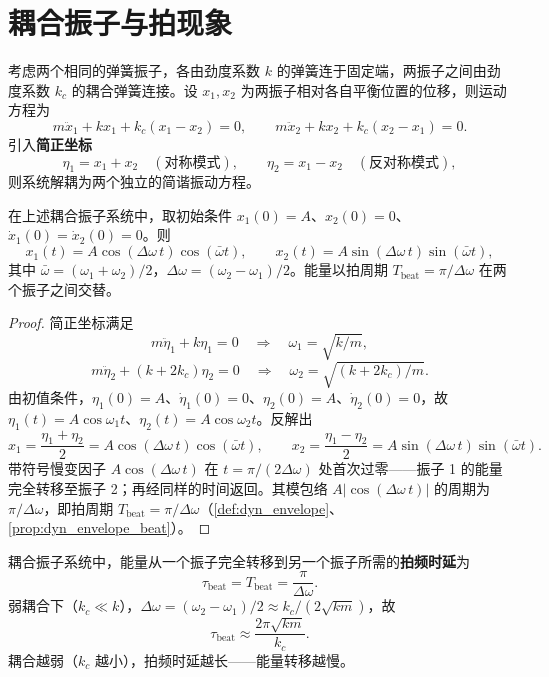 \section{耦合振子与拍现象}

\begin{definition}[耦合弹簧振子系统]\label{def:coupled_oscillators}
考虑两个相同的弹簧振子，各由劲度系数 $k$ 的弹簧连于固定端，两振子之间由劲度系数 $k_c$ 的耦合弹簧连接。设 $x_1, x_2$ 为两振子相对各自平衡位置的位移，则运动方程为
\[
m\ddot{x}_1 + kx_1 + k_c(x_1 - x_2) = 0, \qquad m\ddot{x}_2 + kx_2 + k_c(x_2 - x_1) = 0.
\]
引入\textbf{简正坐标}
\[
\eta_1 = x_1 + x_2 \quad (\text{对称模式}), \qquad \eta_2 = x_1 - x_2 \quad (\text{反对称模式}),
\]
则系统解耦为两个独立的简谐振动方程。
\end{definition}

\begin{proposition}\label{prop:beat_phenomenon}
在上述耦合振子系统中，取初始条件 $x_1(0) = A$、$x_2(0) = 0$、$\dot x_1(0) = \dot x_2(0) = 0$。则
\[
x_1(t) = A\cos(\Delta\omega \, t)\cos(\bar{\omega} t), \qquad x_2(t) = A\sin(\Delta\omega \, t)\sin(\bar{\omega} t),
\]
其中 $\bar\omega = (\omega_1 + \omega_2)/2$，$\Delta\omega = (\omega_2 - \omega_1)/2$。能量以拍周期 $T_{\text{beat}} = \pi/\Delta\omega$ 在两个振子之间交替。
\end{proposition}

\begin{proof}
简正坐标满足
\[
m\ddot\eta_1 + k\eta_1 = 0 \quad \Rightarrow \quad \omega_1 = \sqrt{k/m},
\]
\[
m\ddot\eta_2 + (k + 2k_c)\eta_2 = 0 \quad \Rightarrow \quad \omega_2 = \sqrt{(k+2k_c)/m}.
\]
由初值条件，$\eta_1(0) = A$、$\dot\eta_1(0) = 0$、$\eta_2(0) = A$、$\dot\eta_2(0) = 0$，故 $\eta_1(t) = A\cos\omega_1 t$、$\eta_2(t) = A\cos\omega_2 t$。反解出
\[
x_1 = \frac{\eta_1 + \eta_2}{2} = A\cos(\Delta\omega\, t)\cos(\bar\omega t), \qquad
x_2 = \frac{\eta_1 - \eta_2}{2} = A\sin(\Delta\omega\, t)\sin(\bar\omega t).
\]
带符号慢变因子 $A\cos(\Delta\omega\, t)$ 在 $t = \pi/(2\Delta\omega)$ 处首次过零——振子 1 的能量完全转移至振子 2；再经同样的时间返回。其模包络 $A|\cos(\Delta\omega\, t)|$ 的周期为 $\pi/\Delta\omega$，即拍周期 $T_{\text{beat}} = \pi/\Delta\omega$（\cref{def:dyn_envelope}、\cref{prop:dyn_envelope_beat}）。
\end{proof}

\begin{definition}[耦合振子的拍频时延]\label{def:coupled_beat_delay}
耦合振子系统中，能量从一个振子完全转移到另一个振子所需的\textbf{拍频时延}为
\[
\tau_{\text{beat}} = T_{\text{beat}} = \frac{\pi}{\Delta\omega}.
\]
弱耦合下（$k_c \ll k$），$\Delta\omega = (\omega_2-\omega_1)/2 \approx k_c/(2\sqrt{km})$，故
\[
\tau_{\text{beat}} \approx \frac{2\pi\sqrt{km}}{k_c}.
\]
耦合越弱（$k_c$ 越小），拍频时延越长——能量转移越慢。
\end{definition}


